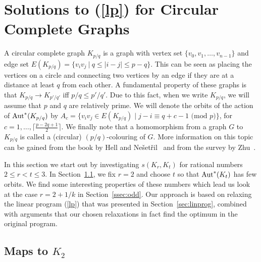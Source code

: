 \documentclass[11pt,a4paper]{article}
\begin{document}
\section{Solutions to (\ref{lp}) for Circular Complete Graphs} \label{sec:meas}

A circular complete graph $K_{p/q}$ is a graph with vertex set
$\{v_0,v_1,\ldots,v_{n-1}\}$ and edge set $E(K_{p/q}) = \{v_i v_j \ | \ q \leq |i-j|
\leq p-q\}$. This can be seen as placing the vertices on a circle and
connecting two vertices by an edge if they are at a distance at least
$q$ from each other. A fundamental property of these graphs is that
$K_{p/q} \rightarrow K_{p'/q'}$ iff $p/q \leq p'/q'$.
Due to this fact, when we write $K_{p/q}$, we will assume that $p$ and $q$
are relatively prime.
We will denote the orbits of the action of $\mbox{\rm Aut}^*(K_{p/q})$ by
$A_c = \{ v_i v_j \in E(K_{p/q}) \;|\; j-i \equiv q+c-1 \text{ (mod $p$)} \}$,
for $c = 1, \ldots, \lceil \frac{p-2q+1}{2} \rceil$.
We finally note that a
homomorphism from a graph $G$ to $K_{p/q}$ is called a (circular)
$(p/q)$-colouring of $G$. 
More information on this topic can be gained
from the book by Hell and Ne\v{s}et\v{r}il~\cite{HN04} and from the
survey by Zhu~\cite{zhu:survey}.

In this section we start out by investigating $s(K_r, K_t)$
for rational numbers $2 \leq r < t \leq 3$.
In Section~\ref{ssec:k2}, we fix $r=2$ and choose $t$ so that
$\mbox{\rm Aut}^*(K_{t})$ has few orbits.
We find some interesting properties of these numbers which lead
us look at the case $r = 2+1/k$ in Section~\ref{ssec:odd}.
Our approach is based on relaxing the linear program (\ref{lp})
that was presented in Section~\ref{sec:linprog}, combined with
arguments that our chosen relaxations in fact find the optimum
in the original program.


\subsection{Maps to $K_2$} \label{ssec:k2}
\end{document}
